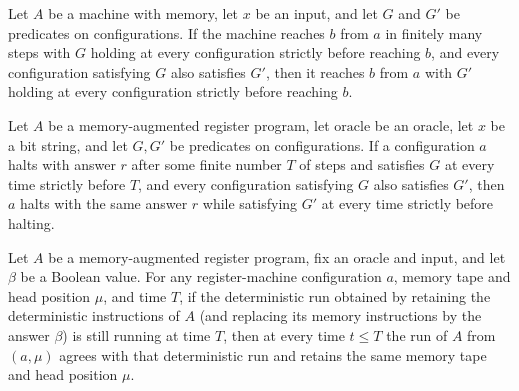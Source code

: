 \begin{lemma}
\label{Complexity.LogProg.MReach.mono}
\leanok
{}
Let $A$ be a machine with memory, let $x$ be an input, and let $G$ and $G'$ be
predicates on configurations. If the machine reaches $b$ from $a$ in finitely many steps
with $G$ holding at every configuration strictly before reaching $b$, and every
configuration satisfying $G$ also satisfies $G'$, then it reaches $b$ from $a$ with $G'$
holding at every configuration strictly before reaching $b$.
\end{lemma}

\begin{lemma}
\label{Complexity.LogProg.MHalt.mono}
\leanok
{}
Let $A$ be a memory-augmented register program, let $\mathrm{oracle}$ be an oracle, let
$x$ be a bit string, and let $G,G'$ be predicates on configurations. If a configuration
$a$ halts with answer $r$ after some finite number $T$ of steps and satisfies $G$ at
every time strictly before $T$, and every configuration satisfying $G$ also satisfies
$G'$, then $a$ halts with the same answer $r$ while satisfying $G'$ at every time
strictly before halting.
\end{lemma}

\begin{lemma}
\label{Complexity.LogProg.mrun_eq_arun}
\leanok
{}
Let $A$ be a memory-augmented register program, fix an oracle and input, and let $\beta$
be a Boolean value. For any register-machine configuration $a$, memory tape and head
position $\mu$, and time $T$, if the deterministic run obtained by retaining the
deterministic instructions of $A$ (and replacing its memory instructions by the answer
$\beta$) is still running at time $T$, then at every time $t\le T$ the run of $A$ from
$(a,\mu)$ agrees with that deterministic run and retains the same memory tape and head
position $\mu$.
\end{lemma}

